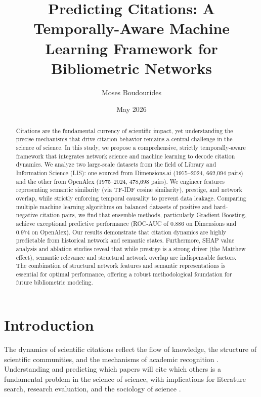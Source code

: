 \documentclass[12pt,a4paper]{article}
\title{Predicting Citations: A Temporally-Aware Machine Learning Framework for Bibliometric Networks}
\author{Moses Boudourides}
\date{May 2026}
\begin{document}
\maketitle

\begin{abstract}
Citations are the fundamental currency of scientific impact, yet understanding the precise mechanisms that drive citation behavior remains a central challenge in the science of science. In this study, we propose a comprehensive, strictly temporally-aware framework that integrates network science and machine learning to decode citation dynamics. We analyze two large-scale datasets from the field of Library and Information Science (LIS): one sourced from Dimensions.ai (1975--2024, 662,094 pairs) and the other from OpenAlex (1975--2024, 478,698 pairs). We engineer features representing semantic similarity (via TF-IDF cosine similarity), prestige, and network overlap, while strictly enforcing temporal causality to prevent data leakage. Comparing multiple machine learning algorithms on balanced datasets of positive and hard-negative citation pairs, we find that ensemble methods, particularly Gradient Boosting, achieve exceptional predictive performance (ROC-AUC of 0.886 on Dimensions and 0.974 on OpenAlex). Our results demonstrate that citation dynamics are highly predictable from historical network and semantic states. Furthermore, SHAP value analysis and ablation studies reveal that while prestige is a strong driver (the Matthew effect), semantic relevance and structural network overlap are indispensable factors. The combination of structural network features and semantic representations is essential for optimal performance, offering a robust methodological foundation for future bibliometric modeling.
\end{abstract}

\newpage
\tableofcontents
\newpage

\section{Introduction}
The dynamics of scientific citations reflect the flow of knowledge, the structure of scientific communities, and the mechanisms of academic recognition \cite{wang2008measuring, fortunato2018science}. Understanding and predicting which papers will cite which others is a fundamental problem in the science of science, with implications for literature search, research evaluation, and the sociology of science \cite{zeng2017science}.
\end{document}
